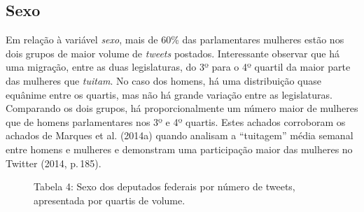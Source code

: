 
\subsection{Sexo}

Em relação à variável \textit{sexo}, mais de 60\% das parlamentares mulheres
estão nos dois grupos de maior volume de \textit{tweets} postados.
Interessante observar que há uma migração, entre as duas legislaturas,
do 3º para o 4º quartil da maior parte das mulheres que \textit{tuitam}.
No caso dos homens, há uma distribuição quase equânime entre os quartis,
mas não há grande variação entre as legislaturas. Comparando os dois
grupos, há proporcionalmente um número maior de mulheres que de homens
parlamentares nos 3º e 4º quartis. Estes achados corroboram os achados
de Marques et al. (2014a) quando analisam a ``tuitagem'' média semanal
entre homens e mulheres e demonstram uma participação maior das mulheres
no Twitter (2014, p.\,185).

\begin{figure}[!ht]


\caption{Tabela 4: Sexo dos deputados federais por número de tweets,
apresentada por quartis de volume.\footnotemark}
\end{figure}

